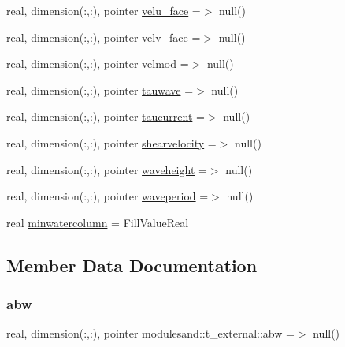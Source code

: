 \begin{DoxyCompactItemize}
\item 
real, dimension(\+:,\+:), pointer \mbox{\hyperlink{structmodulesand_1_1t__external_a131d3951b00a5f1985696a0a0c6a54ac}{velu\+\_\+face}} =$>$ null()
\item 
real, dimension(\+:,\+:), pointer \mbox{\hyperlink{structmodulesand_1_1t__external_a579ef54a5b4cbef834a178597287e585}{velv\+\_\+face}} =$>$ null()
\item 
real, dimension(\+:,\+:), pointer \mbox{\hyperlink{structmodulesand_1_1t__external_ac871d250a368c47c7906212392fcfdd0}{velmod}} =$>$ null()
\item 
real, dimension(\+:,\+:), pointer \mbox{\hyperlink{structmodulesand_1_1t__external_a6118ee891b3f857842f73c7535a7be95}{tauwave}} =$>$ null()
\item 
real, dimension(\+:,\+:), pointer \mbox{\hyperlink{structmodulesand_1_1t__external_ac53b7e2c05ad03552fd5ec396ca6583b}{taucurrent}} =$>$ null()
\item 
real, dimension(\+:,\+:), pointer \mbox{\hyperlink{structmodulesand_1_1t__external_aa039bf74d9a46b177fa259c89d969e7d}{shearvelocity}} =$>$ null()
\item 
real, dimension(\+:,\+:), pointer \mbox{\hyperlink{structmodulesand_1_1t__external_a8a1587b04bc6e4dc3434e1135ea9b5d9}{waveheight}} =$>$ null()
\item 
real, dimension(\+:,\+:), pointer \mbox{\hyperlink{structmodulesand_1_1t__external_a14d1b15e1ac58979600ce9d78d696de8}{waveperiod}} =$>$ null()
\item 
real \mbox{\hyperlink{structmodulesand_1_1t__external_af5f094a762818fb18b83e3a4b4865234}{minwatercolumn}} = Fill\+Value\+Real
\end{DoxyCompactItemize}


\subsection{Member Data Documentation}
\mbox{\label{structmodulesand_1_1t__external_a4c73f602711bfc0939219dfe4cbbbfcc}} 
\subsubsection{\texorpdfstring{abw}{abw}}
{\footnotesize\ttfamily real, dimension(\+:,\+:), pointer modulesand\+::t\+\_\+external\+::abw =$>$ null()\hspace{0.3cm}{\ttfamily [private]}}

